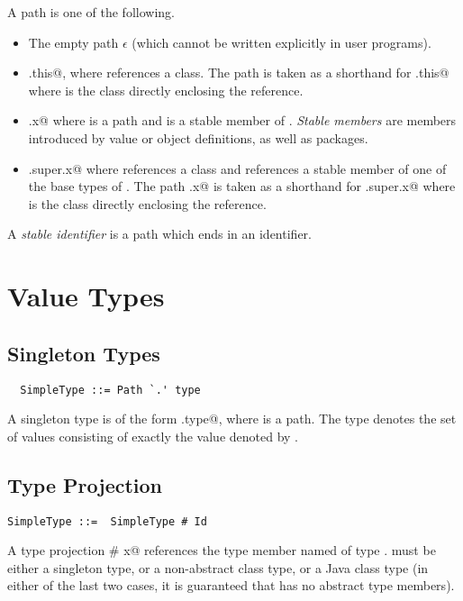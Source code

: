 \documentclass[11pt]{report}
\begin{document}
A path is one of the following.
\begin{itemize}
\item
The empty path $\epsilon$ (which cannot be written explicitly in user programs).
\item
\verb@C.this@, where \verb@C@ references a class. 
The path \verb@this@ is taken as a shorthand for \verb@C.this@ where 
\verb@C@ is the class directly enclosing the reference. 
\item
\verb@p.x@ where \verb@p@ is a path and \verb@x@ is a stable member of \verb@p@.
{\em Stable members} are members introduced by value or object
definitions, as well as packages.
\item
\verb@C.super.x@ where \verb@C@ references a class and \verb@x@ references a 
stable member of
one of the base types of \verb@C@. 
The path \verb@super.x@ is taken as a shorthand for \verb@C.super.x@ where 
\verb@C@ is the class directly enclosing the reference. 
\end{itemize}
A {\em stable identifier} is a path which ends in an identifier.

\section{Value Types}

\subsection{Singleton Types}
\label{sec:singleton-type}

\syntax\begin{verbatim}
  SimpleType ::= Path `.' type
\end{verbatim}

A singleton type is of the form \verb@p.type@, where \verb@p@ is a
path.  The type denotes the set of values consisting of
exactly the value denoted by \verb@p@.

\subsection{Type Projection}
\label{sec:type-project}

\syntax\begin{verbatim} 
SimpleType ::=  SimpleType # Id
\end{verbatim}

A type projection \verb@T # x@ references the type member named 
\verb@x@ of type \verb@T@. \verb@T@ must be either a singleton type,
or a non-abstract class type, or a Java class type (in either of the
last two cases, it is guaranteed that \verb@T@ has no abstract type
members).
\end{document}

